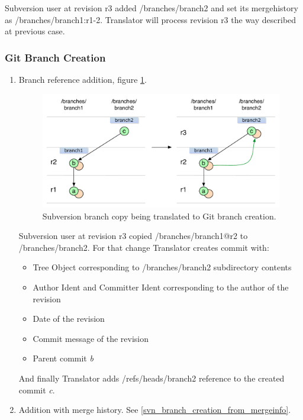\begin{enumerate}
Subversion user at revision r3 added /branches/branch2 and set its mergehistory as /branches/branch1:r1-2. Translator will process revision r3 the way described at previous case.
\end{enumerate}

\subsubsection{Git Branch Creation}

\begin{enumerate}
\compactlist
\item Branch reference addition, figure \ref{git_branch_creation}.

\begin{figure}[!h]
\centering
\includegraphics[width=\linewidth]{img/diagrams/branch_creation_git_to_svn.pdf}
\caption{Subversion branch copy being translated to Git branch creation.}
\label{git_branch_creation}
\end{figure}

Subversion user at revision r3 copied /branches/branch1@r2 to /branches/branch2. For that change Translator creates commit with:
\begin{itemize}
	\item Tree Object corresponding to /branches/branch2 subdirectory contents
	\item Author Ident and Committer Ident corresponding to the author of the revision
	\item Date of the revision
	\item Commit message of the revision
	\item Parent commit \emph{b}
\end{itemize}
And finally Translator adds /refs/heads/branch2 reference to the created commit \emph{c}.

\item Addition with merge history. See \ref{svn_branch_creation_from_mergeinfo}.


\end{enumerate}
